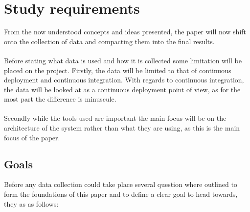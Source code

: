 %
%
%
%
%
%

\section{Study requirements}

From the now understood concepts and ideas presented, the paper will now shift onto the collection of data and compacting them into the final results. 
\\\\
Before stating what data is used and how it is collected some limitation will be placed on the project. Firstly, the data will be limited to that of continuous deployment and continuous integration. With regards to continuous integration, the data will be looked at as a continuous deployment point of view, as for the most part the difference is minuscule.
\\\\
Secondly while the tools used are important the main focus will be on the architecture of the system rather than what they are using, as this is the main focus of the paper.

\subsection{Goals}

Before any data collection could take place several question where outlined to form the foundations of this paper and to define a clear goal to head towards, they as as follows:

